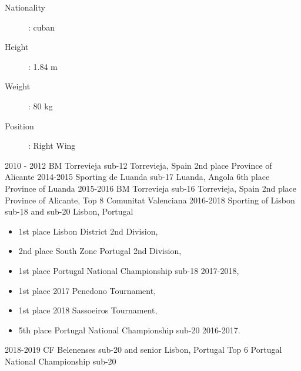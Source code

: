 \documentclass[9pt]{developercv} %
\begin{document}
\vspace{0.5cm}

\begin{description}
	\item[Nationality]: cuban
	\item[Height]: 1.84 m
	\item[Weight]: 80 kg
	\item[Position]: Right Wing
\end{description}




\begin{entrylist}
	\entry
			{2010 - 2012}
		{BM Torrevieja sub-12}
		{Torrevieja, Spain}
		{2nd place Province of Alicante}
	\entry
			{2014-2015}
		{Sporting de Luanda sub-17}
		{Luanda, Angola}
		{6th place Province of Luanda}
	\entry
			{2015-2016}
		{BM Torrevieja sub-16}
		{Torrevieja, Spain}
		{2nd place Province of Alicante, Top 8 Comunitat Valenciana}
	\entry
			{2016-2018}
		{Sporting of Lisbon sub-18 and sub-20}
		{Lisbon, Portugal}
		{\begin{itemize}
		\item 1st place Lisbon District 2nd Division,
		\item 2nd place South Zone Portugal 2nd Division,
		\item 1st place Portugal National Championship sub-18 2017-2018,
		\item 1st place 2017 Penedono Tournament,
		\item 1st place 2018 Sassoeiros Tournament,
		\item 5th place Portugal National Championship sub-20 2016-2017.
		\end{itemize}}
	\entry
				{2018-2019}
		{CF Belenenses sub-20 and senior}
		{Lisbon, Portugal}
		{Top 6 Portugal National Championship sub-20}
	
\end{entrylist}
\end{document}
